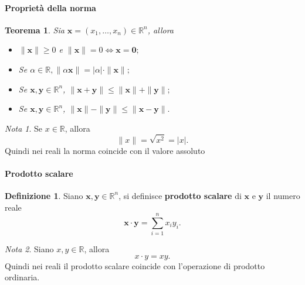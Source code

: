 \documentclass{article}
\theoremstyle{plain}
\newtheorem{thm}{Teorema}[section]
\theoremstyle{definition}
\newtheorem{defn}{Definizione}[section]
\theoremstyle{remark}
\newtheorem{note}{Nota}
\begin{document}
\paragraph{Proprietà della norma}
\begin{bxthm}
\begin{thm}
    Sia $\mathbf{x}=(x_1,\ldots,x_n)\in\mathbb{R}^n$, allora
    \begin{itemize}
        \item $\|\mathbf{x}\|\geq0$ e $\|\mathbf{x}\|=0 \iff \mathbf{x}=\mathbf{0};$
        \item Se $\alpha\in\mathbb{R}, \|\alpha \mathbf{x}\|=|\alpha|\cdot\|\mathbf{x}\|;$
        \item Se $\mathbf{x},\mathbf{y}\in\mathbb{R}^n$, $\|\mathbf{x}+\mathbf{y}\|\leq\|\mathbf{x}\|+\|\mathbf{y}\|;$
        \item Se $\mathbf{x},\mathbf{y}\in\mathbb{R}^n$, $\|\mathbf{x}\|-\|\mathbf{y}\|\leq\|\mathbf{x}-\mathbf{y}\|.$
    \end{itemize}
\end{thm}
\end{bxthm}

\vspace{10pt}

\begin{note}
    Se $x\in\mathbb{R}$, allora \[\|x\|=\sqrt{x^2}=|x|.\]
    Quindi nei reali la norma coincide con il valore assoluto
\end{note}

\vspace{10pt}

\paragraph{Prodotto scalare}
\begin{bxthm}
\begin{defn}
    Siano $\mathbf{x},\mathbf{y}\in\mathbb{R}^n$, si definisce \textbf{prodotto scalare} di $\mathbf{x}$ e $\mathbf{y}$ il numero reale 
    \[\mathbf{x}\cdot \mathbf{y}=\sum_{i=1}^{n}x_iy_i.\]
\end{defn}
\end{bxthm}

\vspace{10pt}

\begin{note}
    Siano $x,y\in\mathbb{R}$, allora \[x\cdot y= xy.\]
    Quindi nei reali il prodotto scalare coincide con l'operazione di prodotto ordinaria. 
\end{note}
\end{document}

